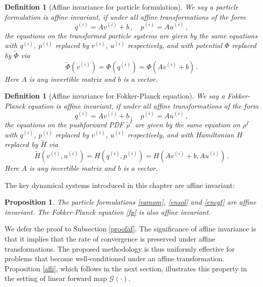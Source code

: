 \documentclass[12pt]{caltech_thesis}
\newtheorem{proposition}[theorem]{Proposition}
\newtheorem{definition}[theorem]{Definition}
\numberwithin{equation}{section}
\begin{document}
\vspace{0.1in}

\begin{definition}[Affine invariance for particle formulation]
\label{af}
We say a particle formulation is affine invariant, if under all affine 
transformations of the form 
\begin{equation}
\label{eq:aft}
q^{(i)}=A v^{(i)}+b\,,\quad p^{(i)}=A u^{(i)}\,,
\end{equation}
the equations on the transformed particle systems are given by the same equations with $q^{(i)}$, $p^{(i)}$ replaced by $v^{(i)}$, $u^{(i)}$ respectively, and with potential $\Phi$ replaced by $\tilde{\Phi}$ via \[\tilde{\Phi}(v^{(i)})=\Phi(q^{(i)})=\Phi(Av^{(i)}+b)\,.\]
Here $A$ is any invertible matrix and $b$ is a vector.
\end{definition}

\vspace{0.1in}

\begin{definition}[Affine invariance for Fokker-Planck equation]
\label{af1}
We say a Fokker-Planck equation is affine invariant, if under all affine transformations of the form \[q^{(i)}=A v^{(i)}+b\,,\quad p^{(i)}=A u^{(i)}\,,\]
the equations on the pushforward PDF $\tilde{\rho}^I$ are given by the same equation on ${\rho}^I$ with $q^{(i)}$, $p^{(i)}$ replaced by $v^{(i)}$, $u^{(i)}$ respectively, and with Hamiltonian $H$ replaced by $\tilde{H}$ via
\[ \tilde{H}(v^{(i)}, u^{(i)})=H(q^{(i)}, p^{(i)})=H(Av^{(i)}+b,Au^{(i)})\,.\]
Here $A$ is any invertible matrix and $b$ is a vector.
\end{definition}

\vspace{0.1in}

The key dynamical systems introduced in this chapter are affine invariant:

\vspace{0.1in}

\begin{proposition}
\label{aft}
The particle formulations \eqref{eqmom}, \eqref{ensol} and \eqref{encgf} are affine invariant. The Fokker-Planck equation \eqref{fp} is also affine invariant.
\end{proposition}

\vspace{0.1in}

{We defer the proof to Subsection \ref{proofaf}. The significance of affine invariance
is that it implies that the rate of convergence is preserved under affine transformations.
The proposed methodology is thus uniformly effective for problems that become well-conditioned under an affine transformation.
Proposition \ref{afli}, which follows in the next section, illustrates this property
in the setting of linear forward map $\mathcal{G}(\cdot).$}
\end{document}
